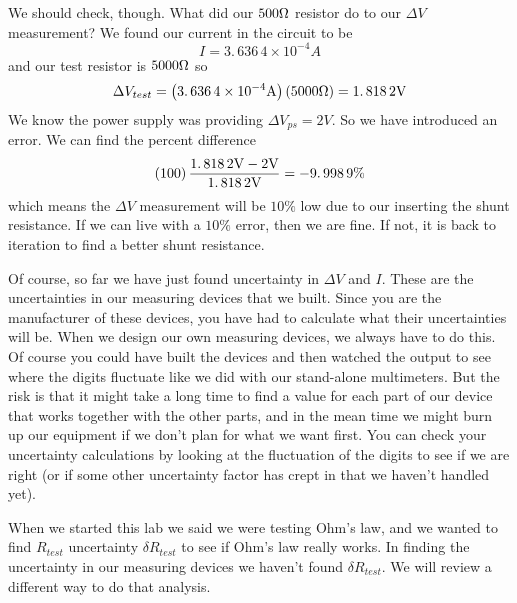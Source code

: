 We should check, though. What did our $500\unit{%
\Omega%
}$ resistor do to our $\Delta V$ measurement? We found our current in the
circuit to be 
\begin{equation*}
I=3.\,\allowbreak 636\,4\times 10^{-4}\unit{A}
\end{equation*}%
and our test resistor is $5000\unit{%
\Omega%
}$ so 
\begin{equation*}
\Delta V_{test}=\left( 3.\,\allowbreak 636\,4\times 10^{-4}\unit{A}\right)
\left( 5000\unit{%
\Omega%
}\right) =1.\,\allowbreak 818\,2\unit{V}
\end{equation*}%
We know the power supply was providing $\Delta V_{ps}=2\unit{V}$. So we have
introduced an error. We can find the percent difference 
\begin{equation*}
\left( 100\right) \frac{1.\,\allowbreak 818\,2\unit{V}-2\unit{V}}{%
1.\,\allowbreak 818\,2\unit{V}}=-9.\,\allowbreak 998\,9\%
\end{equation*}%
which means the $\Delta V$ measurement will be $10\%$ low due to our
inserting the shunt resistance. If we can live with a $10\%$ error, then we
are fine. If not, it is back to iteration to find a better shunt resistance.

Of course, so far we have just found uncertainty in $\Delta V$ and $I$.
These are the uncertainties in our measuring devices that we built. Since
you are the manufacturer of these devices, you have had to calculate what
their uncertainties will be. When we design our own measuring devices, we
always have to do this. Of course you could have built the devices and then
watched the output to see where the digits fluctuate like we did with our
stand-alone multimeters. But the risk is that it might take a long time to
find a value for each part of our device that works together with the other
parts, and in the mean time we might burn up our equipment if we don't plan
for what we want first. You can check your uncertainty calculations by
looking at the fluctuation of the digits to see if we are right (or if some
other uncertainty factor has crept in that we haven't handled yet).

When we started this lab we said we were testing Ohm's law, and we wanted to
find $R_{test}$ uncertainty $\delta R_{test}$ to see if Ohm's law really
works. In finding the uncertainty in our measuring devices we haven't found $%
\delta R_{test}.$ We will review a different way to do that analysis.

